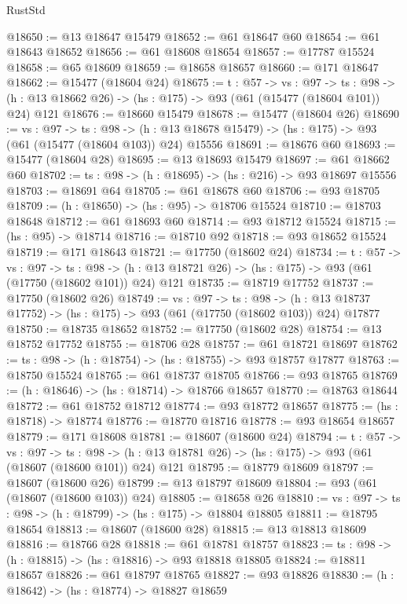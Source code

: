 \begin{lexlean}{RustStd}
\begin{coremodule}
@18650 := @13 @18647 @15479
@18652 := @61 @18647 @60
@18654 := @61 @18643 @18652
@18656 := @61 @18608 @18654
@18657 := @17787 @15524
@18658 := @65 @18609
@18659 := @18658 @18657
@18660 := @171 @18647
@18662 := @15477 (@18604 @24)
@18675 := {t : @57} ->
  {vs : @97} ->
  {ts : @98} -> (h : @13 @18662 @26) -> (hs : @175) -> @93 (@61 (@15477 (@18604 @101)) @24) @121
@18676 := @18660 @15479
@18678 := @15477 (@18604 @26)
@18690 := {vs : @97} ->
  {ts : @98} ->
  (h : @13 @18678 @15479) -> (hs : @175) -> @93 (@61 (@15477 (@18604 @103)) @24) @15556
@18691 := @18676 @60
@18693 := @15477 (@18604 @28)
@18695 := @13 @18693 @15479
@18697 := @61 @18662 @60
@18702 := {ts : @98} -> (h : @18695) -> (hs : @216) -> @93 @18697 @15556
@18703 := @18691 @64
@18705 := @61 @18678 @60
@18706 := @93 @18705
@18709 := (h : @18650) -> (hs : @95) -> @18706 @15524
@18710 := @18703 @18648
@18712 := @61 @18693 @60
@18714 := @93 @18712 @15524
@18715 := (hs : @95) -> @18714
@18716 := @18710 @92
@18718 := @93 @18652 @15524
@18719 := @171 @18643
@18721 := @17750 (@18602 @24)
@18734 := {t : @57} ->
  {vs : @97} ->
  {ts : @98} -> (h : @13 @18721 @26) -> (hs : @175) -> @93 (@61 (@17750 (@18602 @101)) @24) @121
@18735 := @18719 @17752
@18737 := @17750 (@18602 @26)
@18749 := {vs : @97} ->
  {ts : @98} ->
  (h : @13 @18737 @17752) -> (hs : @175) -> @93 (@61 (@17750 (@18602 @103)) @24) @17877
@18750 := @18735 @18652
@18752 := @17750 (@18602 @28)
@18754 := @13 @18752 @17752
@18755 := @18706 @28
@18757 := @61 @18721 @18697
@18762 := {ts : @98} -> (h : @18754) -> (hs : @18755) -> @93 @18757 @17877
@18763 := @18750 @15524
@18765 := @61 @18737 @18705
@18766 := @93 @18765
@18769 := (h : @18646) -> (hs : @18714) -> @18766 @18657
@18770 := @18763 @18644
@18772 := @61 @18752 @18712
@18774 := @93 @18772 @18657
@18775 := (hs : @18718) -> @18774
@18776 := @18770 @18716
@18778 := @93 @18654 @18657
@18779 := @171 @18608
@18781 := @18607 (@18600 @24)
@18794 := {t : @57} ->
  {vs : @97} ->
  {ts : @98} -> (h : @13 @18781 @26) -> (hs : @175) -> @93 (@61 (@18607 (@18600 @101)) @24) @121
@18795 := @18779 @18609
@18797 := @18607 (@18600 @26)
@18799 := @13 @18797 @18609
@18804 := @93 (@61 (@18607 (@18600 @103)) @24)
@18805 := @18658 @26
@18810 := {vs : @97} -> {ts : @98} -> (h : @18799) -> (hs : @175) -> @18804 @18805
@18811 := @18795 @18654
@18813 := @18607 (@18600 @28)
@18815 := @13 @18813 @18609
@18816 := @18766 @28
@18818 := @61 @18781 @18757
@18823 := {ts : @98} -> (h : @18815) -> (hs : @18816) -> @93 @18818 @18805
@18824 := @18811 @18657
@18826 := @61 @18797 @18765
@18827 := @93 @18826
@18830 := (h : @18642) -> (hs : @18774) -> @18827 @18659

\end{coremodule}
\end{lexlean}
